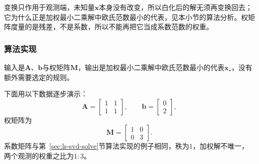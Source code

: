 变换只作用于观测端，未知量$\bm x$本身没有改变，所以白化后的解无须再变换回去；它为什么正是加权最小二乘解中欧氏范数最小的代表，见本小节的算法分析。权矩阵度量的是残差，不是系数，所以不能再把它当成系数范数的权重。

\subsubsection{算法实现}
输入是$\bm A$、$\bm b$与权矩阵$\bm M$，输出是加权最小二乘解中欧氏范数最小的代表$\bm x_\star$，没有额外需要选定的规则。

下面用以下数据逐步演示：
\[
 \bm A=\begin{bmatrix}1&1\\1&1\end{bmatrix},\qquad
 \bm b=\begin{bmatrix}0\\2\end{bmatrix},
\]
权矩阵为
\[
 \bm M=\begin{bmatrix}1&0\\0&3\end{bmatrix}.
\]
系数矩阵与第~\ref{sec:ls-svd-solve}节算法实现的例子相同，秩为$1$，加权解不唯一，两个观测的权重之比为$1:3$。
